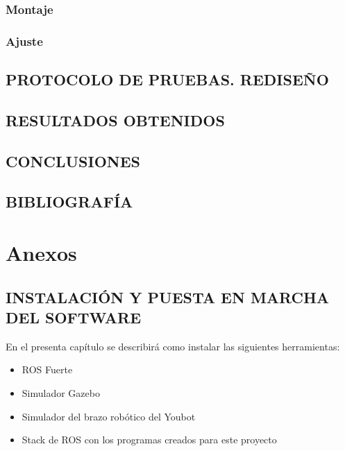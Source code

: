 \documentclass[12pt, a4paper]{report}
\begin{document}
\section{Montaje}
\section{Ajuste}

\chapter{PROTOCOLO DE PRUEBAS. REDISEÑO}

\chapter{RESULTADOS OBTENIDOS}



\chapter{CONCLUSIONES}



\chapter{BIBLIOGRAFÍA}



\part{Anexos}

\appendix

\chapter{INSTALACIÓN Y PUESTA EN MARCHA DEL SOFTWARE}

En el presenta capítulo se describirá como instalar las siguientes herramientas:

\begin{itemize}
\item{ROS Fuerte}
\item{Simulador Gazebo}
\item{Simulador del brazo robótico del Youbot}
\item{Stack de ROS con los programas creados para este proyecto}
\end{itemize}
\end{document}
